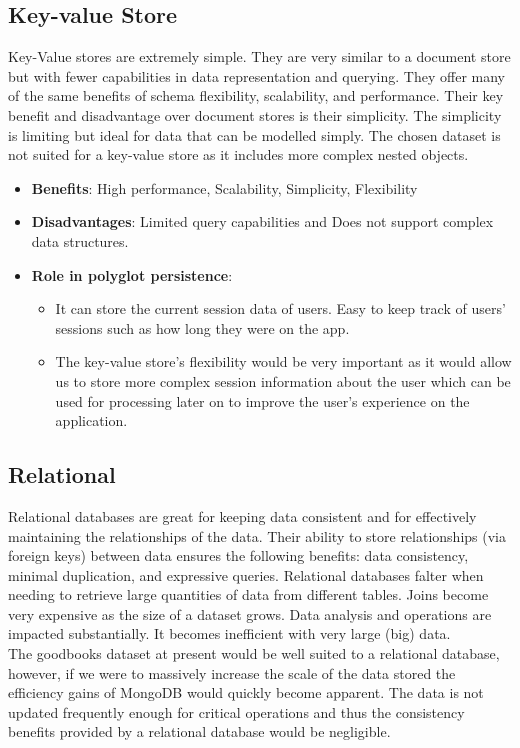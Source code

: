 \documentclass[11pt]{article}
\begin{document}
\subsection{Key-value Store}
\label{sec:orgd4ff47d}
Key-Value stores are extremely simple. They are very similar to a document store but with fewer capabilities in data representation and querying. They offer many of the same benefits of schema flexibility, scalability, and performance. Their key benefit and disadvantage over document stores is their simplicity. The simplicity is limiting but ideal for data that can be modelled simply. The chosen dataset is not suited for a key-value store as it includes more complex nested objects.
\begin{itemize}
\item \textbf{Benefits}: High performance, Scalability, Simplicity, Flexibility
\item \textbf{Disadvantages}: Limited query capabilities and Does not support complex data structures.
\item \textbf{Role in polyglot persistence}:
\begin{itemize}
\item It can store the current session data of users. Easy to keep track of users' sessions such as how long they were on the app.
\item The key-value store's flexibility would be very important as it would allow us to store more complex session information about the user which can be used for processing later on to improve the user's experience on the application.
\end{itemize}
\end{itemize}
\subsection{Relational}
\label{sec:org1a353ec}
Relational databases are great for keeping data consistent and for effectively maintaining the relationships of the data. Their ability to store relationships (via foreign keys) between data ensures the following benefits: data consistency, minimal duplication, and expressive queries. Relational databases falter when needing to retrieve large quantities of data from different tables. Joins become very expensive as the size of a dataset grows. Data analysis and operations are impacted substantially. It becomes inefficient with very large (big) data.\\
\linebreak
The goodbooks dataset at present would be well suited to a relational database, however, if we were to massively increase the scale of the data stored the efficiency gains of MongoDB would quickly become apparent. The data is not updated frequently enough for critical operations and thus the consistency benefits provided by a relational database would be negligible.
\end{document}
